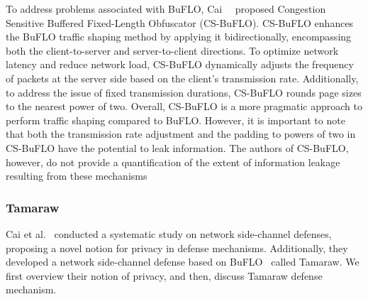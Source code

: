 To address problems associated with BuFLO, Cai~\etal~\cite{cai2014cs} proposed Congestion Sensitive Buffered Fixed-Length Obfuscator (CS-BuFLO).
CS-BuFLO enhances the BuFLO traffic shaping method by applying it bidirectionally, encompassing both the client-to-server and server-to-client directions. 
To optimize network latency and reduce network load, CS-BuFLO dynamically adjusts the frequency of packets at the server side based on the client's transmission rate.
Additionally, to address the issue of fixed transmission durations, CS-BuFLO rounds page sizes to the nearest power of two. 
Overall, CS-BuFLO is a more pragmatic approach to perform traffic shaping compared to BuFLO. 
However, it is important to note that both the transmission rate adjustment and the padding to powers of two in CS-BuFLO have the potential to leak information.
The authors of CS-BuFLO, however, do not provide a quantification of the extent of information leakage resulting from these mechanisms


\subsubsection{Tamaraw}\label{subsubsec:tamaraw}
Cai et al.~\cite{cai2014systematic} conducted a systematic study on network side-channel defenses, proposing a novel notion for privacy in defense mechanisms.
Additionally, they developed a network side-channel defense based on BuFLO~\cite{dyer2012peek} called Tamaraw. 
We first overview their notion of privacy, and then, discuss Tamaraw defense mechanism.


